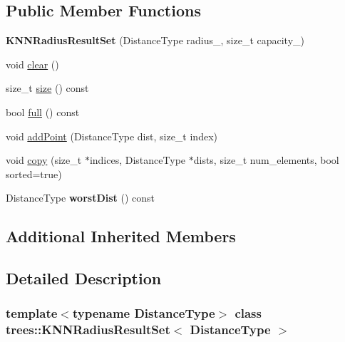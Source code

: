 \subsection*{Public Member Functions}
\begin{DoxyCompactItemize}
\item 
\mbox{\label{classtrees_1_1_k_n_n_radius_result_set_a96bb96f5d6feeda00fafe84cf2458cc9}} 
{\bfseries K\+N\+N\+Radius\+Result\+Set} (Distance\+Type radius\+\_\+, size\+\_\+t capacity\+\_\+)
\item 
void \hyperlink{classtrees_1_1_k_n_n_radius_result_set_afc08b678752c4fb938a12a6346a3123f}{clear} ()
\item 
size\+\_\+t \hyperlink{classtrees_1_1_k_n_n_radius_result_set_a3e6a6b74d2dbf9792f4ed632ce4be376}{size} () const
\item 
bool \hyperlink{classtrees_1_1_k_n_n_radius_result_set_aac419c31445e99d3f13830f803c61082}{full} () const
\item 
void \hyperlink{classtrees_1_1_k_n_n_radius_result_set_af19b65b3e39f5ef1715a1d7cb4afc8c5}{add\+Point} (Distance\+Type dist, size\+\_\+t index)
\item 
void \hyperlink{classtrees_1_1_k_n_n_radius_result_set_a2e4e41546c6290f5e0c1d2fcc5845024}{copy} (size\+\_\+t $\ast$indices, Distance\+Type $\ast$dists, size\+\_\+t num\+\_\+elements, bool sorted=true)
\item 
\mbox{\label{classtrees_1_1_k_n_n_radius_result_set_a8d2829817802878069fede73816bf78d}} 
Distance\+Type {\bfseries worst\+Dist} () const
\end{DoxyCompactItemize}
\subsection*{Additional Inherited Members}


\subsection{Detailed Description}
\subsubsection*{template$<$typename Distance\+Type$>$\newline
class trees\+::\+K\+N\+N\+Radius\+Result\+Set$<$ Distance\+Type $>$}

